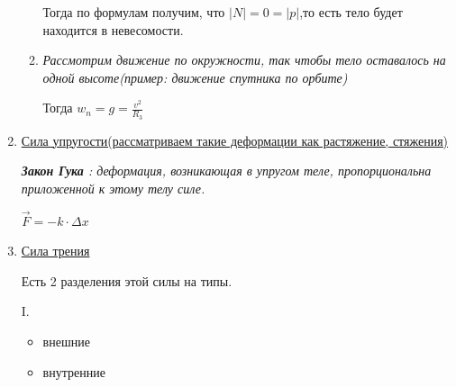 \documentclass[12pt,a4paper]{report}
\begin{document}
\begin{enumerate}
\begin{enumerate}
                    Тогда по формулам получим, что $|N| = 0 = |p|$,то есть тело будет находится в невесомости.
              \item \textit{Рассмотрим движение по окружности, так чтобы тело оставалось на одной высоте(пример: движение спутника по орбите)}

                    \vspace{5px}

                    Тогда $w_n = g = \frac{v^2}{R_3}$
          \end{enumerate}

    \item \underline{Сила упругости(рассматриваем такие деформации как растяжение, стяжения)}

          \textit{\textbf{Закон Гука} : деформация, возникающая в упругом теле, пропорциональна приложенной к этому телу силе.}

          $\vec F = -k \cdot \Delta x$
    \item \underline{Сила трения}

          Есть 2 разделения этой силы на типы.

          I. \begin{itemize}
              \item внешние
              \item внутренние
          \end{itemize}


\end{enumerate}
\end{document}
